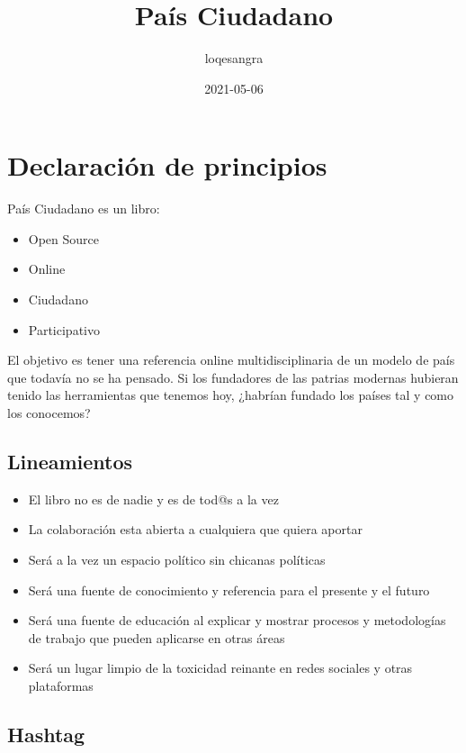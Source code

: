 \documentclass[
]{book}
\title{País Ciudadano}
\author{loqesangra}
\date{2021-05-06}
\providecommand{\tightlist}{%
  \setlength{\itemsep}{0pt}\setlength{\parskip}{0pt}}
\begin{document}
\maketitle

{
\setcounter{tocdepth}{1}
\tableofcontents
}
\hypertarget{declaraciuxf3n-de-principios}{%
\chapter{Declaración de principios}\label{declaraciuxf3n-de-principios}}

País Ciudadano es un libro:

\begin{itemize}
\tightlist
\item
  Open Source
\item
  Online
\item
  Ciudadano
\item
  Participativo
\end{itemize}

El objetivo es tener una referencia online multidisciplinaria de un modelo de país que todavía no se ha pensado. Si los fundadores de las patrias modernas hubieran tenido las herramientas que tenemos hoy, ¿habrían fundado los países tal y como los conocemos?

\hypertarget{lineamientos}{%
\section{Lineamientos}\label{lineamientos}}

\begin{itemize}
\tightlist
\item
  El libro no es de nadie y es de tod@s a la vez
\item
  La colaboración esta abierta a cualquiera que quiera aportar
\item
  Será a la vez un espacio político sin chicanas políticas
\item
  Será una fuente de conocimiento y referencia para el presente y el futuro
\item
  Será una fuente de educación al explicar y mostrar procesos y metodologías de trabajo que pueden aplicarse en otras áreas
\item
  Será un lugar limpio de la toxicidad reinante en redes sociales y otras plataformas
\end{itemize}

\hypertarget{hashtag}{%
\section{Hashtag}\label{hashtag}}
\end{document}
